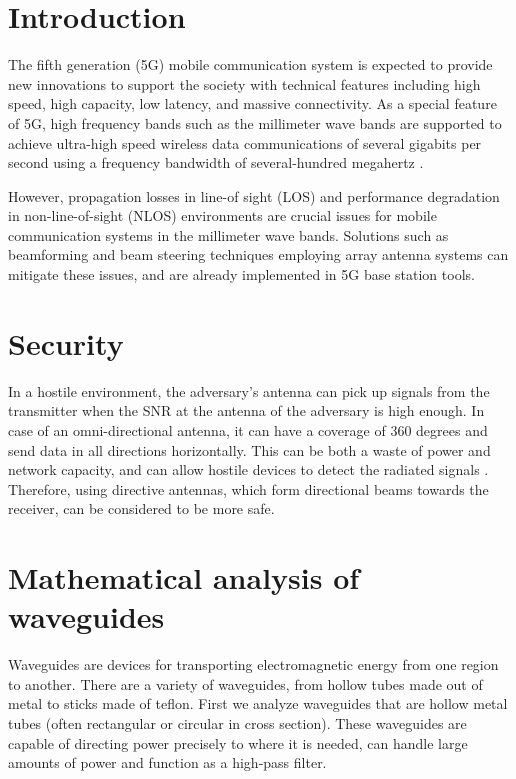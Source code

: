 \documentclass[a4paper,11pt]{jsarticle}
\begin{document}
\title{}
\author{}
\date{\today}
\maketitle

\section{Introduction}

The fifth generation (5G) mobile communication system
is expected to provide new innovations to support the society
with technical features including high speed, high
capacity, low latency, and massive connectivity.
As a special
feature of 5G, high frequency bands such as the millimeter
wave bands are supported to achieve ultra-high speed
wireless data communications of several gigabits per second
using a frequency bandwidth of
several-hundred megahertz \cite{docomo_6G_white_paper}.

However, propagation losses in line-of sight (LOS) and
performance degradation in non-line-of-sight (NLOS)
environments are crucial issues for mobile communication
systems in the millimeter wave bands. 
Solutions such as beamforming and
beam steering techniques employing array antenna systems
can mitigate these issues, and are
already implemented in 5G base station tools.
\cite{https://doi.org/10.48550/arxiv.2001.05021}

\section{Security}

In a hostile environment, the adversary's antenna can pick up signals from the
transmitter when the SNR at the antenna of the adversary is high enough.
In case of an omni-directional antenna, it can have a coverage of 360 degrees
and send data in all directions horizontally.
This can be both a waste of power and network capacity,
and can allow hostile devices to detect the radiated signals \cite{security_estimation_model}.
Therefore, using directive antennas, which form directional beams towards the receiver,
can be considered to be more safe.

\section{Mathematical analysis of waveguides}

Waveguides are devices for transporting electromagnetic energy
from one region to another.
There are a variety of waveguides, from hollow tubes made out of metal to
sticks made of teflon.
First we analyze waveguides that are hollow metal tubes
(often rectangular or circular in cross section).
These waveguides are capable of directing power precisely to where it is needed,
can handle large amounts of power and function as a high-pass filter.
\end{document}
